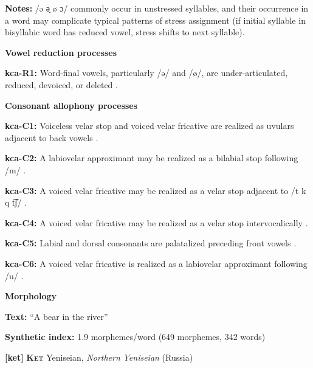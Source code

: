 \textbf{Notes:} /ə ə̘ ø ɔ/ commonly occur in unstressed syllables, and their occurrence in a word may complicate typical patterns of stress assignment (if initial syllable in bisyllabic word has reduced vowel, stress shifts to next syllable).



\textbf{Vowel reduction processes}



\textbf{kca-R1:} Word-final vowels, particularly /ə/ and /ø/, are under-articulated, reduced, devoiced, or deleted \citep[56]{Filchenko2007}.



\textbf{Consonant allophony processes}



\textbf{kca-C1:} Voiceless velar stop and voiced velar fricative are realized as uvulars adjacent to back vowels \citep[41]{Filchenko2007}.



\textbf{kca-C2:} A labiovelar approximant may be realized as a bilabial stop following /m/ \citep[44-45]{Filchenko2007}.



\textbf{kca-C3:} A voiced velar fricative may be realized as a velar stop adjacent to /t k q t͡ʃ/ \citep[45]{Filchenko2007}.



\textbf{kca-C4:} A voiced velar fricative may be realized as a velar stop intervocalically \citep[45]{Filchenko2007}.



\textbf{kca-C5:} Labial and dorsal consonants are palatalized preceding front vowels \citep[37]{Filchenko2007}.



\textbf{kca-C6:} A voiced velar fricative is realized as a labiovelar approximant following /u/ \citep[45-6]{Filchenko2007}.



\textbf{Morphology}



\textbf{Text:} “A bear in the river” \citep[582-588]{Filchenko2007}



\textbf{Synthetic index:} 1.9 morphemes/word (649 morphemes, 342 words)



\textbf{[ket]}   \textbf{\textsc{Ket}}  Yeniseian, \textit{Northern} \textit{Yeniseian} (Russia)



